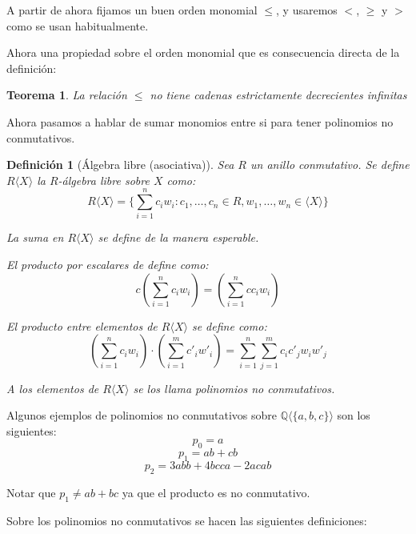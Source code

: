 \documentclass{amsbook} %
\theoremstyle{customstyle}
\newtheorem{definition}{Definición}[chapter]
\newtheorem{theorem}{Teorema}[chapter]
\theoremstyle{factstyle}
\begin{document}
A partir de ahora fijamos un buen orden monomial $≤$, y usaremos $<$, $≥$ y $>$ como se usan habitualmente.

Ahora una propiedad sobre el orden monomial que es consecuencia directa de la definición:

\begin{theorem}\label{thm:≤ no cadenas dec inf}
La relación $≤$ no tiene cadenas estrictamente decrecientes infinitas
\end{theorem}

Ahora pasamos a hablar de sumar monomios entre si para tener polinomios no conmutativos.

\begin{definition}[Álgebra libre (asociativa)]
Sea $R$ un anillo conmutativo. Se define $R⟨X⟩$ la $R$-álgebra libre sobre $X$ como:
\[ R⟨X⟩ = \{∑_{i = 1}^n c_i w_i : c_1, …, c_n ∈ R, w_1, …, w_n ∈ ⟨X⟩\} \]

La suma en $R⟨X⟩$ se define de la manera esperable.

El producto por escalares de define como:
\[ c (∑_{i = 1}^n c_i w_i) = (∑_{i = 1}^n c c_i w_i) \]

El producto entre elementos de $R⟨X⟩$ se define como:
\[ (∑_{i = 1}^n c_i w_i) · (∑_{i = 1}^m c'_i w'_i) = ∑_{i = 1}^n ∑_{j = 1}^m c_i c'_j w_i w'_j \]

A los elementos de $R⟨X⟩$ se los llama polinomios no conmutativos.
\end{definition}

Algunos ejemplos de polinomios no conmutativos sobre $ℚ⟨\{a, b, c\}⟩$ son los siguientes:
\[ p_0 = a \]
\[ p_1 = ab + cb \]
\[ p_2 = 3 abb + 4 bcca - 2 acab \]

Notar que $p_1 ≠ ab + bc$ ya que el producto es no conmutativo.

Sobre los polinomios no conmutativos se hacen las siguientes definiciones:
\end{document}
